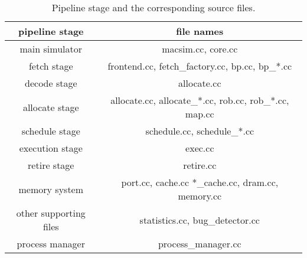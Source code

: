 \ignore
{
\begin{table}[htb]
\begin{footnotesize}
\begin{center}
\caption{Pipeline stage and the corresponding source files.}
\label{table:pipeline}
\begin{tabular}{|c||c|}
\hline 
pipeline stage         & file names                                             \\ \hline \hline 
main simulator         & macsim.cc, core.cc                                     \\ \hline 
fetch stage            & frontend.cc, fetch\_factory.cc, bp.cc, bp\_*.cc        \\ \hline 
decode stage           & allocate.cc                                            \\ \hline 
allocate stage         & allocate.cc, allocate\_*.cc, rob.cc, rob\_*.cc, map.cc \\ \hline 
schedule stage         & schedule.cc, schedule\_*.cc                            \\ \hline 
execution stage        & exec.cc                                                \\ \hline 
retire stage           & retire.cc                                              \\ \hline 
memory system          & port.cc, cache.cc *\_cache.cc, dram.cc, memory.cc      \\ \hline \hline
other supporting files & statistics.cc, bug\_detector.cc                        \\ \hline \hline 
process manager        & process\_manager.cc                                    \\ \hline 
\end{tabular}
\end{center}
\end{footnotesize}
\end{table}
}


